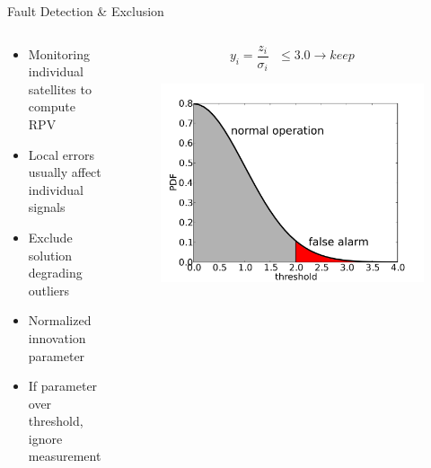 \documentclass{beamer}
\begin{document}
    \begin{frame}{Fault Detection \& Exclusion}
      \begin{columns}
        \begin{column}{0.5\linewidth}
          \begin{itemize} \footnotesize
            \item Monitoring individual satellites to compute RPV
            \item Local errors usually affect individual signals
            \item Exclude solution degrading outliers
            \vfill
            \item Normalized innovation parameter
            \item If parameter over threshold, ignore measurement
          \end{itemize}
        \end{column}
        \begin{column}{0.5\linewidth}
          \begin{displaymath}
            y_i=\frac{z_i}{\sigma_i} ~~~\le 3.0 \rightarrow keep
          \end{displaymath}
          \begin{figure}[ht] \centering 
            \includegraphics[width=\textwidth]{../graphics/fde_plot.png}
          \end{figure}
        \end{column}
      \end{columns}
    \end{frame}
\end{document}
